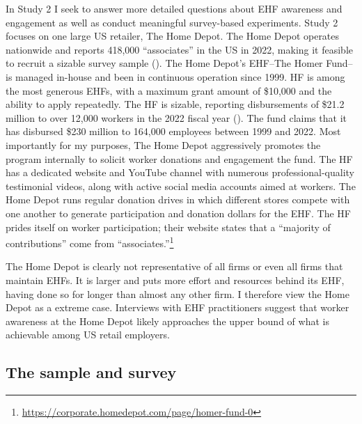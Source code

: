\documentclass[
  11pt,
  oneside]{article}
\begin{document}
In Study 2 I seek to answer more detailed questions about EHF awareness and engagement as well as conduct meaningful survey-based experiments. Study 2 focuses on one large US retailer, The Home Depot. The Home Depot operates nationwide and reports 418,000 ``associates'' in the US in 2022, making it feasible to recruit a sizable survey sample (). The Home Depot's EHF--The Homer Fund--is managed in-house and been in continuous operation since 1999. HF is among the most generous EHFs, with a maximum grant amount of \$10,000 and the ability to apply repeatedly. The HF is sizable, reporting disbursements of \$21.2 million to over 12,000 workers in the 2022 fiscal year (). The fund claims that it has disbursed \$230 million to 164,000 employees between 1999 and 2022. Most importantly for my purposes, The Home Depot aggressively promotes the program internally to solicit worker donations and engagement the fund. The HF has a dedicated website and YouTube channel with numerous professional-quality testimonial videos, along with active social media accounts aimed at workers. The Home Depot runs regular donation drives in which different stores compete with one another to generate participation and donation dollars for the EHF. The HF prides itself on worker participation; their website states that a ``majority of contributions'' come from ``associates.''\footnote{\url{https://corporate.homedepot.com/page/homer-fund-0}}

The Home Depot is clearly not representative of all firms or even all firms that maintain EHFs. It is larger and puts more effort and resources behind its EHF, having done so for longer than almost any other firm. I therefore view the Home Depot as a extreme case. Interviews with EHF practitioners suggest that worker awareness at the Home Depot likely approaches the upper bound of what is achievable among US retail employers.

\subsection{The sample and survey}\label{the-sample-and-survey}
\end{document}
